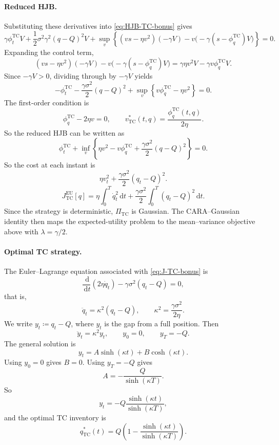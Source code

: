 \documentclass[12pt, a4paper]{article}
\newcommand{\dd}{\,\mathrm{d}}
\newcommand{\kap}{\kappa}
\begin{document}
\paragraph{Reduced HJB.}
Substituting these derivatives into \eqref{eq:HJB-TC-bonus} gives
\[
  \gamma \phi_t^{\mathrm{TC}} V
  +
  \frac{1}{2}\sigma^2\gamma^2(q-Q)^2V
  +
  \sup_v
  \left\{
    (vs-\eta v^2)(-\gamma V)
    -
    v\bigl(-\gamma(s-\phi_q^{\mathrm{TC}})V\bigr)
  \right\}
  = 0.
\]
Expanding the control term,
\[
  (vs-\eta v^2)(-\gamma V)
  -
  v\bigl(-\gamma(s-\phi_q^{\mathrm{TC}})V\bigr)
  =
  \gamma\eta v^2V - \gamma v\phi_q^{\mathrm{TC}}V.
\]
Since $-\gamma V > 0$, dividing through by $-\gamma V$ yields
\begin{equation}
  -\phi_t^{\mathrm{TC}}
  -
  \frac{\gamma\sigma^2}{2}(q-Q)^2
  +
  \sup_v
  \left\{
    v\phi_q^{\mathrm{TC}} - \eta v^2
  \right\}
  = 0.
  \label{eq:reduced-HJB-TC-bonus}
\end{equation}
The first-order condition is
\[
  \phi_q^{\mathrm{TC}} - 2\eta v = 0,
  \qquad
  v_{\mathrm{TC}}^*(t,q) = \frac{\phi_q^{\mathrm{TC}}(t,q)}{2\eta}.
\]
So the reduced HJB can be written as
\begin{equation}
  \phi_t^{\mathrm{TC}}
  +
  \inf_v
  \left\{
    \eta v^2 - v\phi_q^{\mathrm{TC}} + \frac{\gamma\sigma^2}{2}(q-Q)^2
  \right\}
  = 0.
  \label{eq:TC-running-cost-bonus}
\end{equation}
So the cost at each instant is
\[
  \eta v_t^2 + \frac{\gamma\sigma^2}{2}(q_t-Q)^2.
\]
\begin{equation}
  J_{\mathrm{TC}}^{\mathrm{EU}}[q]
  =
  \eta\!\int_0^T \dot q_t^2 \dd t
  +
  \frac{\gamma\sigma^2}{2}\!\int_0^T (q_t-Q)^2 \dd t.
  \label{eq:J-TC-bonus}
\end{equation}
Since the strategy is deterministic, $\Pi_{\mathrm{TC}}$ is Gaussian.
The CARA--Gaussian identity then maps the expected-utility problem to the mean--variance objective above with $\lambda = \gamma/2$.

\paragraph{Optimal TC strategy.}
The Euler--Lagrange equation associated with \eqref{eq:J-TC-bonus} is
\[
  \frac{\dd}{\dd t}(2\eta \dot q_t) - \gamma\sigma^2(q_t-Q) = 0,
\]
that is,
\begin{equation}
  \ddot q_t = \kap^2(q_t-Q),
  \qquad
  \kap^2 = \frac{\gamma\sigma^2}{2\eta}.
  \label{eq:EL-TC-bonus}
\end{equation}
We write $y_t \coloneqq q_t-Q$, where $y_t$ is the gap from a full position.
Then
\[
  \ddot y_t = \kap^2 y_t,
  \qquad
  y_0 = 0,
  \qquad
  y_T = -Q.
\]
The general solution is
\[
  y_t = A\sinh(\kap t) + B\cosh(\kap t).
\]
Using $y_0 = 0$ gives $B=0$.
Using $y_T = -Q$ gives
\[
  A = -\frac{Q}{\sinh(\kap T)}.
\]
So
\[
  y_t = -Q\frac{\sinh(\kap t)}{\sinh(\kap T)},
\]
and the optimal TC inventory is
\begin{equation}
  \boxed{
    q_{\mathrm{TC}}^*(t)
    =
    Q\left(1-\frac{\sinh(\kap t)}{\sinh(\kap T)}\right).
  }
  \label{eq:qstar-TC-bonus}
\end{equation}
\end{document}
